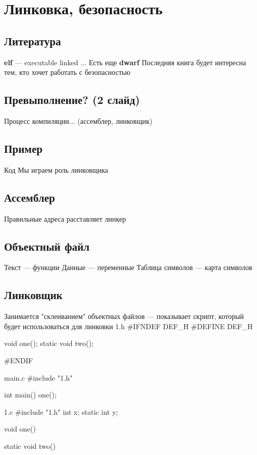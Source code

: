 \chapter{Линковка, безопасность}

\section{Литература}
\textbf{elf} --- executable linked ...
Есть еще \textbf{dwarf}
Последняя книга будет интересна тем, кто хочет работать с безопасностью

\section{Превыполнение? (2 слайд)}
Процесс компиляции... (ассемблер, линковщик)

\section{Пример}
Код
Мы играем роль линковщика

\section{Ассемблер}
Правильные адреса расставляет линкер

\section{Объектный файл}
Текст --- функции
Данные --- переменные
Таблица символов --- карта символов

\section{Линковщик}
Занимается "склеиванием" объектных файлов
 --- показывает скрипт, который будет использоваться для линковки
1.h
#IFNDEF DEF_H
#DEFINE DEF_H

void one();
static void two();

#ENDIF

main.c
#include "1.h"

int main() {
    one();
}

1.c
#include "1.h"
int x;
static int y;

void one() {

}

static void two() {

}

